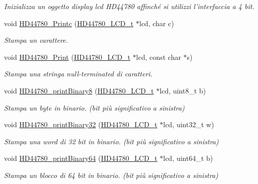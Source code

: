 \begin{DoxyCompactItemize}
\begin{DoxyCompactList}\small\item\em Inizializza un oggetto display lcd H\+D44780 affinché si utilizzi l'interfaccia a 4 bit. \end{DoxyCompactList}\item 
void \hyperlink{group___h_d44780_ga57b8c6ca0b3c12e5f7273b3c373a6f17}{H\+D44780\+\_\+\+Printc} (\hyperlink{struct_h_d44780___l_c_d__t}{H\+D44780\+\_\+\+L\+C\+D\+\_\+t} $\ast$lcd, char c)
\begin{DoxyCompactList}\small\item\em Stampa un carattere. \end{DoxyCompactList}\item 
void \hyperlink{group___h_d44780_ga3aedff8e2040e62db569fde955d3987b}{H\+D44780\+\_\+\+Print} (\hyperlink{struct_h_d44780___l_c_d__t}{H\+D44780\+\_\+\+L\+C\+D\+\_\+t} $\ast$lcd, const char $\ast$s)
\begin{DoxyCompactList}\small\item\em Stampa una stringa null-\/terminated di caratteri. \end{DoxyCompactList}\item 
void \hyperlink{group___h_d44780_ga2a5d4d528175321c46c790b581959e63}{H\+D44780\+\_\+print\+Binary8} (\hyperlink{struct_h_d44780___l_c_d__t}{H\+D44780\+\_\+\+L\+C\+D\+\_\+t} $\ast$lcd, uint8\+\_\+t b)
\begin{DoxyCompactList}\small\item\em Stampa un byte in binario. (bit più significativo a sinistra) \end{DoxyCompactList}\item 
void \hyperlink{group___h_d44780_ga95cceef2401c5519295e5a83c6688b5c}{H\+D44780\+\_\+print\+Binary32} (\hyperlink{struct_h_d44780___l_c_d__t}{H\+D44780\+\_\+\+L\+C\+D\+\_\+t} $\ast$lcd, uint32\+\_\+t w)
\begin{DoxyCompactList}\small\item\em Stampa una word di 32 bit in binario. (bit più significativo a sinistra) \end{DoxyCompactList}\item 
void \hyperlink{group___h_d44780_ga0f99bc5458acb172d0f3bfeb94f90e2a}{H\+D44780\+\_\+print\+Binary64} (\hyperlink{struct_h_d44780___l_c_d__t}{H\+D44780\+\_\+\+L\+C\+D\+\_\+t} $\ast$lcd, uint64\+\_\+t b)
\begin{DoxyCompactList}\small\item\em Stampa un blocco di 64 bit in binario. (bit più significativo a sinistra) \end{DoxyCompactList}\item 

\end{DoxyCompactItemize}
